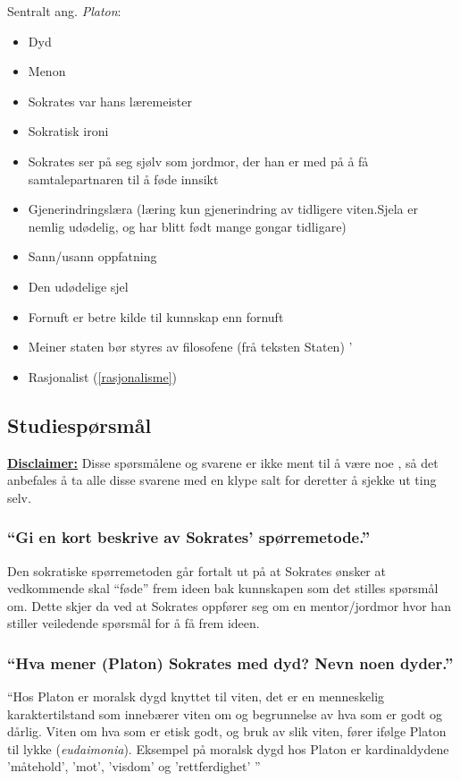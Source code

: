 \documentclass[a4paper]{IEEEtran}
\begin{document}
Sentralt ang. \textit{Platon}:
\begin{itemize}
    \bigskip
    
    \item Dyd
    \item Menon
    \item Sokrates var hans læremeister
    \item Sokratisk ironi
    \item Sokrates ser på seg sjølv som jordmor, der han er med på å få samtalepartnaren til å føde innsikt
    \item Gjenerindringslæra (læring kun gjenerindring av tidligere viten.Sjela er nemlig udødelig, og har blitt født mange gongar tidligare)
    \item Sann/usann oppfatning
    \item Den udødelige sjel
    \item Fornuft er betre kilde til kunnskap enn fornuft
    \item Meiner staten bør styres av filosofene (frå teksten Staten)
    '\item Rasjonalist (\ref{rasjonalisme})
     
\end{itemize}\bigskip

    \subsection{Studiespørsmål}
    \underline{\textbf{Disclaimer:}} Disse spørsmålene og svarene er ikke ment til 
    å være noe , så det anbefales å ta alle disse svarene med en 
    klype salt for deretter å sjekke ut ting selv.
        \subsubsection{``Gi en kort beskrive av Sokrates' spørremetode.''}
        Den sokratiske spørremetoden går fortalt ut på at Sokrates ønsker at vedkommende 
        skal ``føde'' frem ideen bak kunnskapen som det stilles spørsmål om. 
        Dette skjer da ved at Sokrates oppfører seg om en mentor/jordmor hvor
        han stiller veiledende spørsmål for å få frem ideen. \medskip

        \subsubsection{``Hva mener (Platon) Sokrates med dyd? Nevn noen dyder.''}
        ``Hos Platon er moralsk dygd knyttet til viten, det er en menneskelig 
        karaktertilstand som innebærer viten om og begrunnelse av hva som er godt 
        og dårlig. Viten om hva som er etisk godt, og bruk av slik viten, fører 
        ifølge Platon til lykke (\textit{eudaimonia}). Eksempel på moralsk 
        dygd hos Platon er kardinaldydene 'måtehold', 'mot', 'visdom' og 
        'rettferdighet' ''\cite{snl_dyd} \medskip
\end{document}
